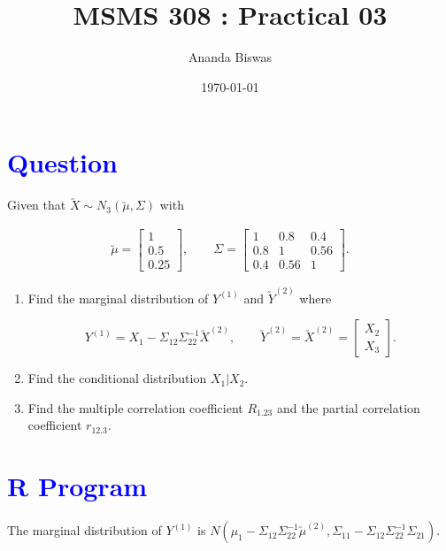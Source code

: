 \documentclass[11pt, a4paper]{article}\usepackage[]{graphicx}\usepackage[]{xcolor}
\title{MSMS 308 : Practical 03}
\author{Ananda Biswas}
\date{\today}
\begin{document}
\maketitle


\section*{\faArrowAltCircleRight[regular] \textcolor{blue}{Question}}

\hspace{1cm} Given that $\utilde{X} \sim N_3(\utilde{\mu}, \Sigma)$ with

\begin{gather*}
\utilde{\mu} = \begin{bmatrix} 1 \\ 0.5 \\ 0.25 \end{bmatrix},
\qquad
\Sigma = \begin{bmatrix} 1 & 0.8 & 0.4 \\ 0.8 & 1 & 0.56 \\ 0.4 & 0.56 & 1 \end{bmatrix}.
\end{gather*}

\begin{enumerate}[(1)]
\item Find the marginal distribution of $Y^{(1)}$ and $\utilde{Y}^{(2)}$ where

$$Y^{(1)} = X_1 - \Sigma_{12}\Sigma_{22}^{-1}\utilde{X}^{(2)}, \qquad \utilde{Y}^{(2)} = \utilde{X}^{(2)} = \begin{bmatrix} X_2 \\ X_3 \end{bmatrix}.$$

\item Find the conditional distribution $X_1 | X_2$.

\item Find the multiple correlation coefficient $R_{1.23}$ and the partial correlation coefficient $r_{12.3}$.
\end{enumerate}

\section*{\faArrowAltCircleRight[regular] \textcolor{blue}{R Program}}

 \hspace{0.1cm} The marginal distribution of $Y^{(1)}$ is $N(\mu_1 - \Sigma_{12}\Sigma_{22}^{-1}\utilde{\mu}^{(2)}, \Sigma_{11} - \Sigma_{12}\Sigma_{22}^{-1}\Sigma_{21})$.
\end{document}
